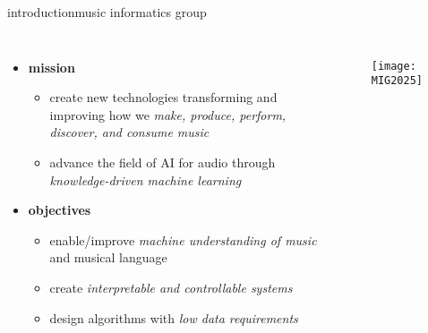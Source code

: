 \begin{frame}{introduction}{music informatics group}
    \vspace{-5mm}
    \begin{columns}
    \begin{itemize}
        \item   \textbf{mission}
            \begin{itemize}
                \item   create new technologies transforming and improving how we \textit{make, produce, perform, discover, and consume music}
                \item   advance the field of AI for audio through \textit{knowledge-driven machine learning}
            \end{itemize}
        \bigskip
        \item   \textbf{objectives}
            \begin{itemize}
                \item   enable/improve \textit{machine understanding of music} and musical language
                \item   create \textit{interpretable and controllable systems}
                \item   design algorithms with \textit{low data requirements}
            \end{itemize}
    \end{itemize}
        \vspace{12mm}
        \begin{figure}%
            \texttt{[image: MIG2025]}%
        \end{figure}
    \end{columns}
    {}
\end{frame}
